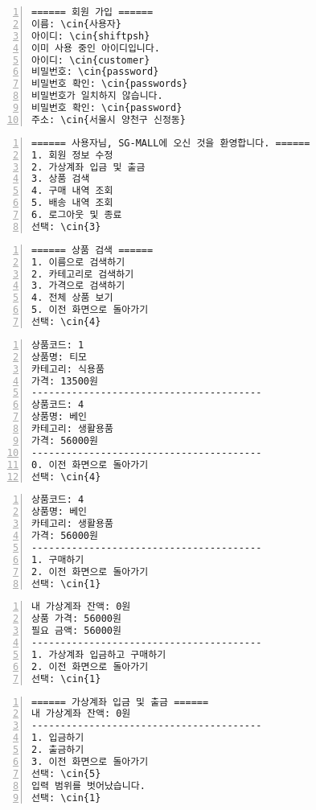 \documentclass[runningheads]{llncs}
\newcommand{\cin}[1]{\textbf{\textcolor{orange}{#1}}}
\begin{document}
\begin{Verbatim}[frame=single,numbers=left,commandchars=\\\{\}]
====== 회원 가입 ======
이름: \cin{사용자}
아이디: \cin{shiftpsh}
이미 사용 중인 아이디입니다.
아이디: \cin{customer}
비밀번호: \cin{password}
비밀번호 확인: \cin{passwords}
비밀번호가 일치하지 않습니다.
비밀번호 확인: \cin{password}
주소: \cin{서울시 양천구 신정동}
\end{Verbatim}

\begin{Verbatim}[frame=single,numbers=left,commandchars=\\\{\}]
====== 사용자님, SG-MALL에 오신 것을 환영합니다. ======
1. 회원 정보 수정
2. 가상계좌 입금 및 출금
3. 상품 검색
4. 구매 내역 조회
5. 배송 내역 조회
6. 로그아웃 및 종료
선택: \cin{3}
\end{Verbatim}

\begin{Verbatim}[frame=single,numbers=left,commandchars=\\\{\}]
====== 상품 검색 ======
1. 이름으로 검색하기
2. 카테고리로 검색하기
3. 가격으로 검색하기
4. 전체 상품 보기
5. 이전 화면으로 돌아가기
선택: \cin{4}
\end{Verbatim}

\begin{Verbatim}[frame=single,numbers=left,commandchars=\\\{\}]
상품코드: 1
상품명: 티모
카테고리: 식용품
가격: 13500원
----------------------------------------
상품코드: 4
상품명: 베인
카테고리: 생활용품
가격: 56000원
----------------------------------------
0. 이전 화면으로 돌아가기
선택: \cin{4}
\end{Verbatim}

\begin{Verbatim}[frame=single,numbers=left,commandchars=\\\{\}]
상품코드: 4
상품명: 베인
카테고리: 생활용품
가격: 56000원
----------------------------------------
1. 구매하기
2. 이전 화면으로 돌아가기
선택: \cin{1}
\end{Verbatim}

\begin{Verbatim}[frame=single,numbers=left,commandchars=\\\{\}]
내 가상계좌 잔액: 0원
상품 가격: 56000원
필요 금액: 56000원
----------------------------------------
1. 가상계좌 입금하고 구매하기
2. 이전 화면으로 돌아가기
선택: \cin{1}
\end{Verbatim}

\begin{Verbatim}[frame=single,numbers=left,commandchars=\\\{\}]
====== 가상계좌 입금 및 출금 ======
내 가상계좌 잔액: 0원
----------------------------------------
1. 입금하기
2. 출금하기
3. 이전 화면으로 돌아가기
선택: \cin{5}
입력 범위를 벗어났습니다.
선택: \cin{1}
\end{Verbatim}
\end{document}
